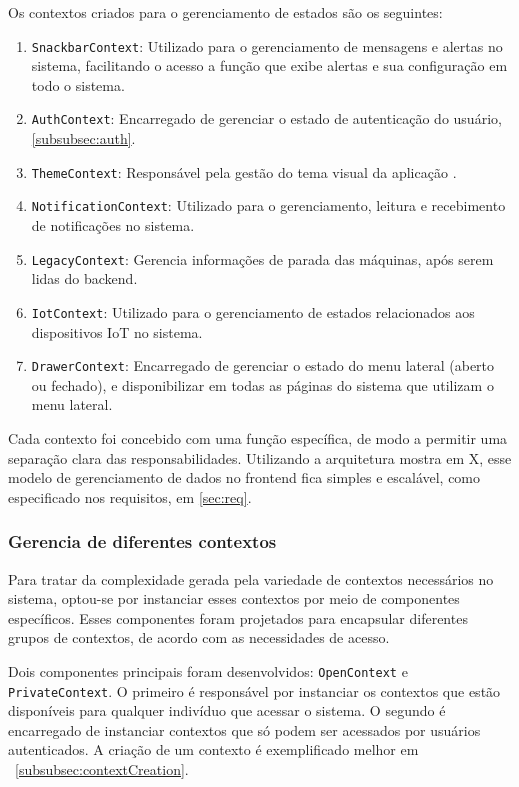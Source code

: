 Os contextos criados para o gerenciamento de estados são os seguintes:
\begin{enumerate}
    \item \texttt{SnackbarContext}: Utilizado para o gerenciamento de mensagens e alertas no sistema, facilitando o acesso a função que exibe alertas e sua configuração em todo o sistema.
    \item \texttt{AuthContext}: Encarregado de gerenciar o estado de autenticação do usuário, \ref{subsubsec:auth}.
    \item \texttt{ThemeContext}: Responsável pela gestão do tema visual da aplicação \cite{muiDefaultTheme}.
    \item \texttt{NotificationContext}: Utilizado para o gerenciamento, leitura e recebimento de notificações no sistema.
    \item \texttt{LegacyContext}: Gerencia informações de parada das máquinas, após serem lidas do backend.
    \item \texttt{IotContext}: Utilizado para o gerenciamento de estados relacionados aos dispositivos IoT no sistema.
    \item \texttt{DrawerContext}: Encarregado de gerenciar o estado do menu lateral (aberto ou fechado), e disponibilizar em todas as páginas do sistema que utilizam o menu lateral.
\end{enumerate}

Cada contexto foi concebido com uma função específica, de modo a permitir uma separação clara das responsabilidades. Utilizando a arquitetura mostra em X, esse modelo de gerenciamento de dados no frontend fica simples e escalável, como especificado nos requisitos, em \ref{sec:req}.

\subsubsection{Gerencia de diferentes contextos}\label{subsubsec:difContexts}
Para tratar da complexidade gerada pela variedade de contextos necessários no sistema, optou-se por instanciar esses contextos por meio de componentes específicos. Esses componentes foram projetados para encapsular diferentes grupos de contextos, de acordo com as necessidades de acesso.

Dois componentes principais foram desenvolvidos: \texttt{OpenContext} e \texttt{PrivateContext}. O primeiro é responsável por instanciar os contextos que estão disponíveis para qualquer indivíduo que acessar o sistema. O segundo é encarregado de instanciar contextos que só podem ser acessados por usuários autenticados. A criação de um contexto é exemplificado melhor em ~\ref{subsubsec:contextCreation}.

